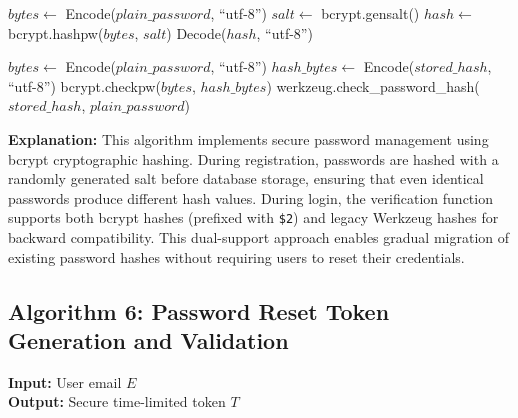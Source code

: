 \begin{algorithm}[H]
\caption{Password Hashing and Verification}
\begin{algorithmic}[1]

    \State $bytes \gets$ Encode($plain\_password$, ``utf-8'')
    \State $salt \gets$ bcrypt.gensalt()
    \State $hash \gets$ bcrypt.hashpw($bytes$, $salt$)
    \State \Return Decode($hash$, ``utf-8'')
\EndFunction

        \State $bytes \gets$ Encode($plain\_password$, ``utf-8'')
        \State $hash\_bytes \gets$ Encode($stored\_hash$, ``utf-8'')
        \State \Return bcrypt.checkpw($bytes$, $hash\_bytes$)
    \Else
        \State \Return werkzeug.check\_password\_hash($stored\_hash$, $plain\_password$)
    \EndIf
\EndFunction

\end{algorithmic}
\end{algorithm}

\textbf{Explanation:}
This algorithm implements secure password management using bcrypt cryptographic hashing. During registration, passwords are hashed with a randomly generated salt before database storage, ensuring that even identical passwords produce different hash values. During login, the verification function supports both bcrypt hashes (prefixed with \texttt{\$2}) and legacy Werkzeug hashes for backward compatibility. This dual-support approach enables gradual migration of existing password hashes without requiring users to reset their credentials.

\subsection{Algorithm 6: Password Reset Token Generation and Validation}

\textbf{Input:} User email $E$ \\
\textbf{Output:} Secure time-limited token $T$


